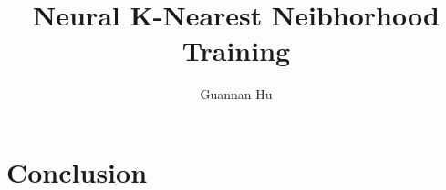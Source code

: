 \documentclass[12pt,a4paper]{article}
\begin{document}
\title{Neural K-Nearest Neibhorhood Training}
\author{Guannan Hu}
\maketitle
\fi
\section{Conclusion}



\ifx\allfiles\undefined


\end{document}
